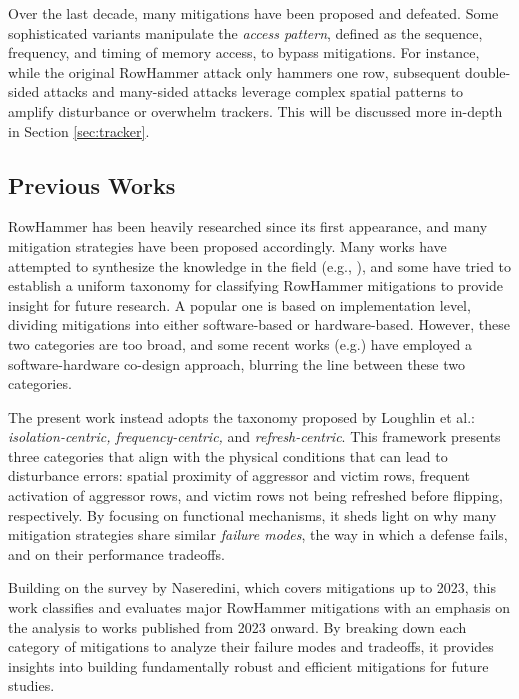 \documentclass[journal,twocolumn]{IEEEtran}
\begin{document}
Over the last decade, many mitigations have been proposed and defeated. Some sophisticated variants manipulate the \textit{access pattern}, defined as the sequence, frequency, and timing of memory access, to bypass mitigations. For instance, while the original RowHammer attack only hammers one row, subsequent double-sided attacks\cite{Seaborn15} and many-sided attacks\cite{Frigo20} leverage complex spatial patterns to amplify disturbance or overwhelm trackers. This will be discussed more in-depth in Section \ref{sec:tracker}.

\subsection{Previous Works}\label{sec:prev-work}

RowHammer has been heavily researched since its first appearance, and many mitigation strategies have been proposed accordingly. Many works have attempted to synthesize the knowledge in the field (e.g., \cite{Naseredini23,Loughlin21,Zhang24,Kim25,MutluKim20,Mutlu23,Mutlu23_2}), and some have tried to establish a uniform taxonomy for classifying RowHammer mitigations to provide insight for future research. A popular one is based on implementation level, dividing mitigations into either software-based or hardware-based. However, these two categories are too broad, and some recent works (e.g.\cite{Ojha25}) have employed a software-hardware co-design approach, blurring the line between these two categories.

The present work instead adopts the taxonomy proposed by Loughlin et al.\cite{Loughlin21}: \textit{isolation-centric, frequency-centric,} and \textit{refresh-centric}. This framework presents three categories that align with the physical conditions that can lead to disturbance errors: spatial proximity of aggressor and victim rows, frequent activation of aggressor rows, and victim rows not being refreshed before flipping, respectively. By focusing on functional mechanisms, it sheds light on why many mitigation strategies share similar \textit{failure modes}, the way in which a defense fails, and on their performance tradeoffs.

Building on the survey by Naseredini\cite{Naseredini23}, which covers mitigations up to 2023, this work classifies and evaluates major RowHammer mitigations with an emphasis on the analysis to works published from 2023 onward. By breaking down each category of mitigations to analyze their failure modes and tradeoffs, it provides insights into building fundamentally robust and efficient mitigations for future studies. 
\end{document}
